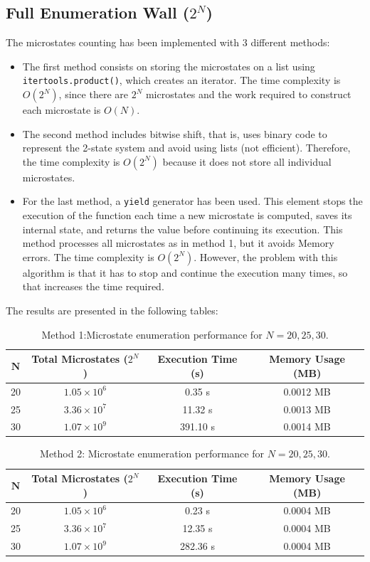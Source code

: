 \documentclass[10pt, a4paper]{article}
\begin{document}
\subsection{Full Enumeration Wall ($2^N$)}
The microstates counting has been implemented with 3 different methods:
\begin{itemize}
    \item The first method consists on storing the microstates on a list using \texttt{itertools.product()}, which creates an iterator. The time complexity is $O(2^N)$, since there are $2^N$ microstates and the work required to construct each microstate is $O(N)$.
    \item The second method includes bitwise shift, that is, uses binary code to represent the 2-state system and avoid using lists (not efficient). Therefore, the time complexity is $O(2^N)$ because it does not store all individual microstates.
    \item For the last method, a \texttt{yield} generator has been used. This element stops the execution of the function each time a new microstate is computed, saves its internal state, and returns the value before continuing its execution. This method processes all microstates as in method 1, but it avoids Memory errors. The time complexity is $O(2^N)$. However, the problem with this algorithm is that it has to stop and continue the execution many times, so that increases the time required.
\end{itemize}
The results are presented in the following tables:

\begin{table}[H]
\centering
\caption{Method 1:Microstate enumeration performance for $N = 20, 25, 30$.}
\vspace{0.5em}
\begin{tabular}{c c c c}
\toprule
$\mathbf{N}$ & \textbf{Total Microstates ($2^N$)} & \textbf{Execution Time (s)} & \textbf{Memory Usage (MB)} \\
\midrule
20 & $1.05 \times 10^6$ & 0.35 s & 0.0012 MB \\
25 & $3.36 \times 10^7$ & 11.32 s & 0.0013 MB \\
30 & $1.07 \times 10^9$ & 391.10 s & 0.0014 MB \\
\bottomrule
\end{tabular}
\end{table}

\begin{table}[H]
\centering
\caption{Method 2: Microstate enumeration performance for $N = 20, 25, 30$.}
\vspace{0.5em}
\begin{tabular}{c c c c}
\toprule
$\mathbf{N}$ & \textbf{Total Microstates ($2^N$)} & \textbf{Execution Time (s)} & \textbf{Memory Usage (MB)} \\
\midrule
20 & $1.05 \times 10^6$ & 0.23 s & 0.0004 MB \\
25 & $3.36 \times 10^7$ & 12.35 s & 0.0004 MB \\
30 & $1.07 \times 10^9$ & 282.36 s & 0.0004 MB \\
\bottomrule
\end{tabular}
\end{table}
\end{document}
